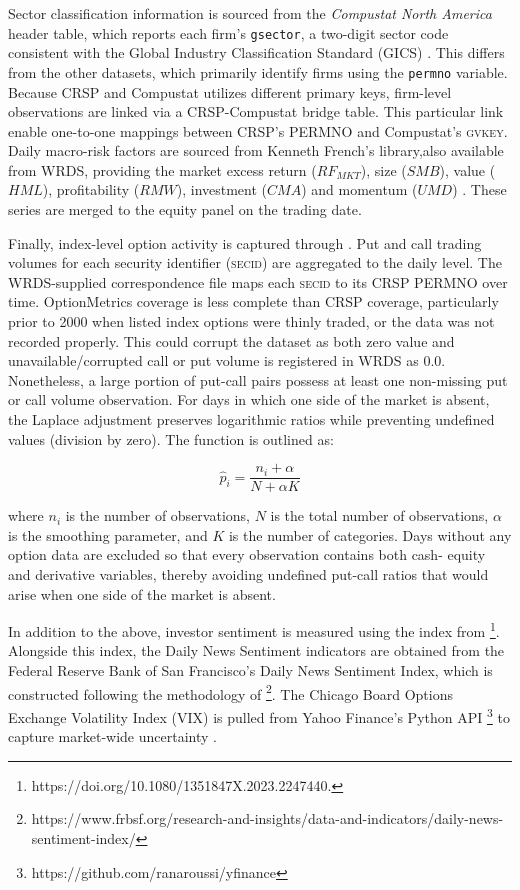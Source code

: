 Sector classification information is sourced from the \emph{Compustat North America} header table, which reports each firm's \texttt{gsector}, a two-digit sector code consistent with the Global Industry Classification Standard (GICS) \cite{compstat}. This differs from the other datasets, which primarily identify firms using the \texttt{permno} variable. Because CRSP and Compustat utilizes different primary keys, firm-level observations are linked via a CRSP-Compustat bridge table. This particular link enable one-to-one mappings between CRSP's PERMNO and Compustat's \textsc{gvkey}. Daily macro-risk factors are sourced from Kenneth French's library,also available from WRDS, providing the market excess return ($RF_{MKT}$), size ($SMB$), value ($HML$), profitability ($RMW$), investment ($CMA$) and momentum ($UMD$) \cite{ff_wrds}. These series are merged to the equity panel on the trading date.

Finally, index-level option activity is captured through . Put and call trading volumes for each security identifier (\textsc{secid}) are aggregated to the daily level. The WRDS-supplied correspondence file maps each \textsc{secid} to its CRSP PERMNO over time. OptionMetrics coverage is less complete than CRSP coverage, particularly prior to 2000 when listed index options were thinly traded, or the data was not recorded properly. This could corrupt the dataset as both zero value and unavailable/corrupted call or put volume is registered in WRDS as 0.0. Nonetheless, a large portion of put-call pairs possess at least one non-missing put or call volume observation. For days in which one side of the market is absent, the Laplace adjustment preserves logarithmic ratios while preventing undefined values (division by zero). The function is outlined as:

\begin{equation}
     \hat{p}_i = \frac{n_i + \alpha}{N + \alpha K}
     \end{equation}

where $n_i$ is the number of observations, $N$ is the total number of observations, $\alpha$ is the smoothing parameter, and $K$ is the number of categories. Days without any option data are excluded so that every observation contains both cash- equity and derivative variables, thereby avoiding undefined put-call ratios that would arise when one side of the market is absent.

In addition to the above, investor sentiment is measured using the index from \footnote{https://doi.org/10.1080/1351847X.2023.2247440.}. Alongside this index, the Daily News Sentiment indicators are obtained from the Federal Reserve Bank of San Francisco's Daily News Sentiment Index, which is constructed following the methodology of  \footnote{https://www.frbsf.org/research-and-insights/data-and-indicators/daily-news-sentiment-index/}. The Chicago Board Options Exchange Volatility Index (VIX) is pulled from Yahoo Finance's Python API \footnote{https://github.com/ranaroussi/yfinance} to capture market-wide uncertainty \cite{vix_cboe}. 
 

